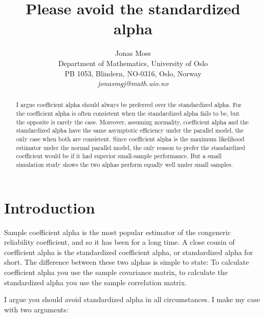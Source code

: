 \documentclass{article}
\title{Please avoid the standardized alpha}
\author{
  Jonas Moss \\
  Department of Mathematics, University of Oslo\\
  PB 1053, Blindern, NO-0316, Oslo, Norway \\
  \it{jonasmgj@math.uio.no}
}
\theoremstyle{plain}
\theoremstyle{plain}
\theoremstyle{definition}
\theoremstyle{remark}
\theoremstyle{definition}
\theoremstyle{plain}
\theoremstyle{plain}
\theoremstyle{definition}
\begin{document}
\maketitle

\begin{abstract}
I argue coefficient alpha should always be preferred over the standardized alpha. For the coefficient alpha is often consistent when the standardized alpha fails to be, but the opposite is rarely the case. Moreover, assuming normality, coefficient alpha and the standardized alpha have the same asymptotic efficiency under the parallel model, the only case when both are consistent. Since coefficient alpha is the maximum likelihood estimator under the normal parallel model, the only reason to prefer the standardized coefficient would be if it had superior small-sample performance. But a small simulation study shows the two alphas perform equally well under small samples.
\end{abstract}


\section{Introduction}
Sample coefficient alpha is the most popular estimator of the congeneric reliability coefficient, and so it has been for a long time. A close cousin of coefficient alpha is the standardized coefficient alpha, or standardized alpha for short. The difference between these two alphas is simple to state: To calculate coefficient alpha you use the sample covariance matrix, to calculate the standardized alpha you use the sample correlation matrix.

I argue you should avoid standardized alpha in all circumstances. I make my case with two arguments:
\end{document}
